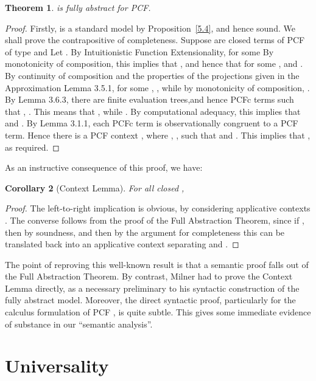\documentclass[11pt]{article}
\newtheorem{theorem}{Theorem}[section]
\newtheorem{corollary}[theorem]{Corollary}
\begin{document}
\begin{theorem}\label{1}
 is fully abstract for PCF.
\end{theorem}
\begin{proof} Firstly,  is a standard model by
Proposition~\ref{5.4}, and hence sound. We shall prove the
contrapositive of completeness. Suppose  are closed terms of
PCF of type  and
 Let . By
Intuitionistic Function Extensionality, for some   By
monotonicity of composition, this implies that
, and hence that  for some , and . By continuity of
composition and the properties of the projections  given in
the Approximation Lemma 3.5.1, for some , , while by
monotonicity of composition, . By Lemma 3.6.3, there are
finite evaluation trees,and hence PCFc terms  such
that , . This
means that , while
. By computational
adequacy, this implies that  and
. By Lemma 3.1.1, each PCFc term
is observationally congruent to a PCF term. Hence there is a PCF
context , where ,
, such that  and
. This implies that , as required.
\end{proof}

As an instructive consequence of this proof, we have:

\begin{corollary}[Context Lemma]
For all closed ,

\end{corollary}
\begin{proof} The left-to-right implication is obvious, by
considering applicative contexts . The converse
follows from the proof of the Full Abstraction Theorem, since if
, then  by soundness, and then by the argument for
completeness this can be translated back into an applicative
context separating  and .
\end{proof}

The point of reproving this well-known result is that a semantic proof
falls out of the Full Abstraction Theorem. By contrast, Milner had to prove
the Context Lemma directly, as a necessary preliminary to his syntactic
construction of the fully abstract model. Moreover, the direct syntactic
proof, particularly for the calculus formulation of PCF
\cite{CurienPL:catcsa}, is quite subtle. This gives some immediate
evidence of substance in our ``semantic analysis''.




\section{Universality}
\end{document}
